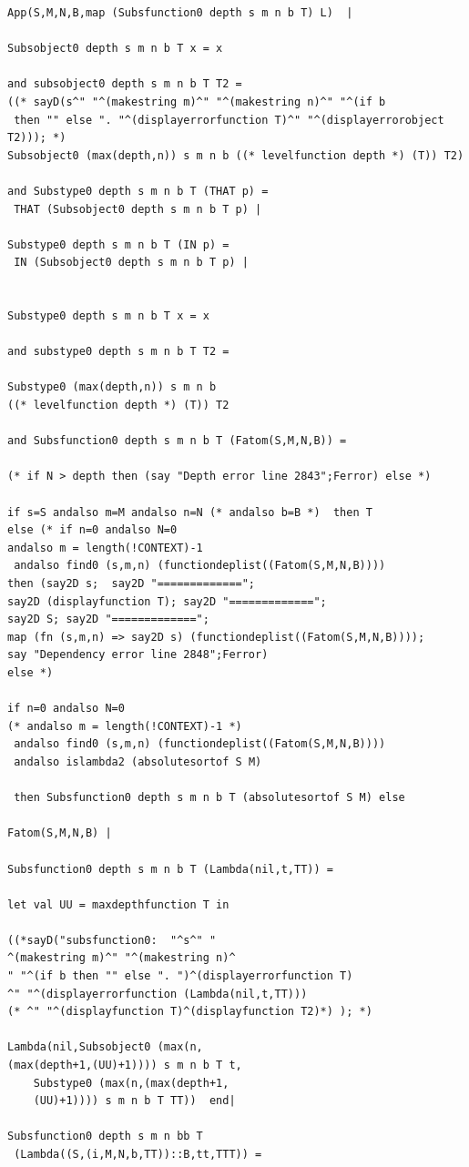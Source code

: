 \documentclass[12pt]{article}
\begin{document}
\begin{verbatim}
App(S,M,N,B,map (Subsfunction0 depth s m n b T) L)  |

Subsobject0 depth s m n b T x = x

and subsobject0 depth s m n b T T2 =
((* sayD(s^" "^(makestring m)^" "^(makestring n)^" "^(if b
 then "" else ". "^(displayerrorfunction T)^" "^(displayerrorobject T2))); *)
Subsobject0 (max(depth,n)) s m n b ((* levelfunction depth *) (T)) T2)

and Substype0 depth s m n b T (THAT p) =
 THAT (Subsobject0 depth s m n b T p) |

Substype0 depth s m n b T (IN p) =
 IN (Subsobject0 depth s m n b T p) |


Substype0 depth s m n b T x = x

and substype0 depth s m n b T T2 =

Substype0 (max(depth,n)) s m n b 
((* levelfunction depth *) (T)) T2

and Subsfunction0 depth s m n b T (Fatom(S,M,N,B)) = 

(* if N > depth then (say "Depth error line 2843";Ferror) else *)

if s=S andalso m=M andalso n=N (* andalso b=B *)  then T
else (* if n=0 andalso N=0
andalso m = length(!CONTEXT)-1
 andalso find0 (s,m,n) (functiondeplist((Fatom(S,M,N,B))))
then (say2D s;  say2D "=============";
say2D (displayfunction T); say2D "=============";
say2D S; say2D "=============";
map (fn (s,m,n) => say2D s) (functiondeplist((Fatom(S,M,N,B))));
say "Dependency error line 2848";Ferror)
else *) 

if n=0 andalso N=0
(* andalso m = length(!CONTEXT)-1 *)
 andalso find0 (s,m,n) (functiondeplist((Fatom(S,M,N,B))))
 andalso islambda2 (absolutesortof S M)
 
 then Subsfunction0 depth s m n b T (absolutesortof S M) else

Fatom(S,M,N,B) |

Subsfunction0 depth s m n b T (Lambda(nil,t,TT)) =

let val UU = maxdepthfunction T in

((*sayD("subsfunction0:  "^s^" "
^(makestring m)^" "^(makestring n)^
" "^(if b then "" else ". ")^(displayerrorfunction T)
^" "^(displayerrorfunction (Lambda(nil,t,TT)))
(* ^" "^(displayfunction T)^(displayfunction T2)*) ); *)

Lambda(nil,Subsobject0 (max(n,
(max(depth+1,(UU)+1)))) s m n b T t,
    Substype0 (max(n,(max(depth+1,
	(UU)+1)))) s m n b T TT))  end|

Subsfunction0 depth s m n bb T
 (Lambda((S,(i,M,N,b,TT))::B,tt,TTT)) =
 

\end{verbatim}
\end{document}
